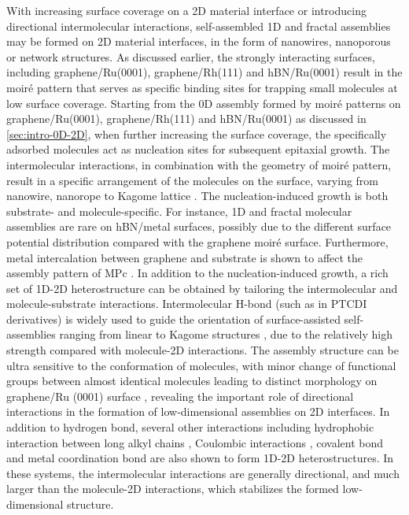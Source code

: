 With increasing surface coverage on a 2D material interface or
introducing directional intermolecular interactions, self-assembled 1D
and fractal assemblies may be formed on 2D material interfaces, in the
form of nanowires, nanoporous or network structures.
%
As discussed earlier, the strongly interacting surfaces, including
graphene/Ru(0001), graphene/Rh(111) and hBN/Ru(0001) result in the
moiré pattern that serves as specific binding sites for trapping small
molecules at low surface coverage.  Starting from the 0D assembly
formed by moiré patterns on graphene/Ru(0001), graphene/Rh(111) and
hBN/Ru(0001) as discussed in \autoref{sec:intro-0D-2D}, when further
increasing the surface coverage, the specifically adsorbed molecules
act as nucleation sites for subsequent epitaxial growth.  The intermolecular interactions, in combination with
the geometry of moiré pattern, result in a specific arrangement of the
molecules on the surface, varying from nanowire, nanorope \cite{Maccariello_2014_TCNQ_gr_Ru} to Kagome
lattice \cite{Atwood_2002_kagome,Mao_2009_Pc_gr_kagome}.
%
The nucleation-induced growth is both substrate- and
molecule-specific. For instance, 1D and fractal molecular assemblies
are rare on hBN/metal
surfaces\cite{Schulz_2013_copc_hbn_moire,Schulz_2014_hBN_moire,Iannuzzi_2014_MPc_hBN_Rh,Joshi_2014_TCNQ_hBN},
possibly due to the different surface potential distribution compared
with the graphene moiré surface. Furthermore, metal intercalation
between graphene and substrate is shown to affect the assembly pattern
of MPc
\cite{Bazarnik_2013_tailor_Fe_Co_gr_Ir,Avvisati_2017_FePc_intercal}.
%
In addition to the nucleation-induced growth, a rich set of 1D-2D
heterostructure can be obtained by tailoring the intermolecular and
molecule-substrate interactions.
%
Intermolecular H-bond (such as in PTCDI derivatives) is widely used to
guide the orientation of surface-assisted self-assemblies ranging from
linear to Kagome structures \cite{Slater_2014_HBond_assembl_rev,
  Pollard_2010_hbond_assembly_gr, }, due to the relatively high
strength compared with molecule-2D interactions.
%
The assembly structure can be ultra sensitive to the conformation of
molecules, with minor change of functional groups between almost
identical molecules leading to distinct morphology on graphene/Ru
(0001) surface
\cite{Meier_2010_polycyclic_gr,Roos_2011_BTP_gr,Roos_2011_hiera_org_gr},
revealing the important role of directional interactions in the
formation of low-dimensional assemblies on 2D
interfaces. 
%
In addition to hydrogen bond, several other interactions including
hydrophobic interaction between long alkyl chains
\cite{De_Feyter_2003_2D_assem_rev, Deshpande_2012_1D_assemb_gr},
Coulombic interactions \cite{Prado_2011_2D_acid_gr}, covalent bond
\cite{Colson_2011_2DMOF_gr,Colson_2014_2D_COF_gr} and metal
coordination bond \cite{Urgel_2015_MOF_BN} are also shown to form
1D-2D heterostructures. In these systems, the intermolecular
interactions are generally directional, and much larger than the molecule-2D
interactions, which stabilizes the formed low-dimensional structure.

